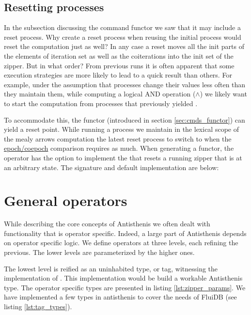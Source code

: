 \subsection{Resetting processes}
\label{sec:process_resetting}

In the subsection discussing the command functor we saw that it may
include a reset process. Why create a reset process when reusing the
initial process would reset the computation just as well? In any case
a reset moves all the init parts of the elements of iteration set as
well as the coiterations into the init set of the zipper. But in what
order? From previous runs it is often apparent that some execution
strategies are more likely to lead to a quick result than others. For
example, under the assumption that processes change their values less
often than they maintain them, while computing a logical AND operation
(\(\land\)) we likely want to start the computation from processes
that previously yielded .

To accommodate this, the  functor (introduced in section
\ref{sec:cmds_functor}) can yield a reset point. While running a
process we maintain in the lexical scope of the mealy arrows
computation the latest reset process to switch to when the
\hyperref[sec:epochs_coepochs]{epoch/coepoch} comparison requires as
much. When generating a  functor, the operator has the
option to implement the  that resets a running zipper
that is at an arbitrary state. The signature and default
implementation are below:


\section{General operators}
\label{sec:antisthenis_ops}

While describing the core concepts of Antisthenis we often dealt with
functionality that is operator specific. Indeed, a large part of
Antisthenis depends on operator specific logic. We define operators at
three levels, each refining the previous. The lower levels are
parameterized by the higher ones.

The lowest level is reified as an uninhabited type, or tag, witnessing
the implementation of . This implementation would
be build a workable Antisthenis type. The operator specific types are
presented in listing \ref{lst:zipper_params}. We have implemented a few types
in antisthenis to cover the needs of FluiDB (see listing
\ref{lst:tag_types}).


